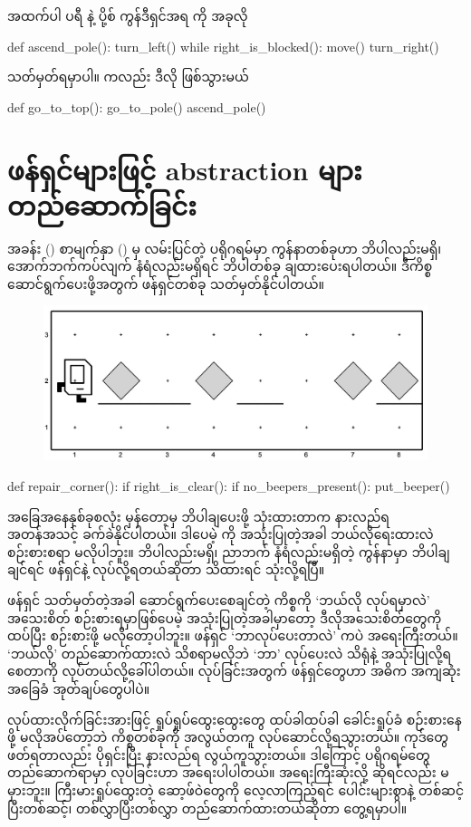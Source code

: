 အထက်ပါ ပရီ နဲ့ ပို့စ် ကွန်ဒီရှင်အရ  ကို အခုလို 
%
\begin{py}
def ascend_pole():
    turn_left()
    while right_is_blocked():
        move()
    turn_right()
\end{py}
%
သတ်မှတ်ရမှာပါ။  ကလည်း ဒီလို ဖြစ်သွားမယ်
%
\begin{py}
def go_to_top():
    go_to_pole()
    ascend_pole()
\end{py}
%

\section{ဖန်ရှင်များဖြင့် abstraction များ တည်ဆောက်ခြင်း}
အခန်း (\fRefNo{\ref{ch:ch02}}) စာမျက်နှာ (\fRefNo{\pageref{lst:repair_street}}) မှ လမ်းပြင်တဲ့ ပရိုဂရမ်မှာ ကွန်နာတစ်ခုဟာ ဘိပါလည်းမရှိ၊ အောက်ဘက်ကပ်လျက် နံရံလည်းမရှိရင်  ဘိပါတစ်ခု ချထားပေးရပါတယ်။ ဒီကိစ္စ ဆောင်ရွက်ပေးဖို့အတွက် ဖန်ရှင်တစ်ခု သတ်မှတ်နိုင်ပါတယ်။ 
%
\begin{figure}[htb!]
    {\includegraphics[width=0.5\linewidth]{images/ch02/st_repair/init.jpg}}
    \caption{}
\end{figure}
%
%
\begin{py}
def repair_corner():
    if right_is_clear():
        if no_beepers_present():
            put_beeper()
\end{py}
%
အခြေအနေနှစ်ခုစလုံး မှန်တော့မှ ဘိပါချပေးဖို့    သုံးထားတာက နားလည်ရ အတန်အသင့် ခက်ခဲနိုင်ပါတယ်။  ဒါပေမဲ့  ကို အသုံးပြုတဲ့အခါ ဘယ်လိုရေးထားလဲ စဉ်းစားစရာ မလိုပါဘူး။ ဘိပါလည်းမရှိ၊ ညာဘက် နံရံလည်းမရှိတဲ့ ကွန်နာမှာ ဘိပါချချင်ရင်  ဖန်ရှင်နဲ့ လုပ်လို့ရတယ်ဆိုတာ သိထားရင် သုံးလို့ရပြီ။

ဖန်ရှင် သတ်မှတ်တဲ့အခါ ဆောင်ရွက်ပေးစေချင်တဲ့ ကိစ္စကို ‘ဘယ်လို လုပ်ရမှာလဲ’ အသေးစိတ် စဉ်းစားရမှာဖြစ်ပေမဲ့ အသုံးပြုတဲ့အခါမှာတော့ ဒီလိုအသေးစိတ်တွေကို ထပ်ပြီး စဉ်းစားဖို့ မလိုတော့ပါဘူး။ ဖန်ရှင် ‘ဘာလုပ်ပေးတာလဲ’ ကပဲ အရေးကြီးတယ်။ ‘ဘယ်လို’ တည်ဆောက်ထားလဲ သိစရာမလိုဘဲ ‘ဘာ’ လုပ်ပေးလဲ သိရုံနဲ့ အသုံးပြုလို့ရစေတာကို  လုပ်တယ်လို့ခေါ်ပါတယ်။  လုပ်ခြင်းအတွက် ဖန်ရှင်တွေဟာ အဓိက အကျဆုံး အခြေခံ အုတ်ချပ်တွေပါပဲ။ 


 လုပ်ထားလိုက်ခြင်းအားဖြင့် ရှုပ်ရှုပ်ထွေးထွေးတွေ ထပ်ခါထပ်ခါ ခေါင်းရှုပ်ခံ စဉ်းစားနေဖို့ မလိုအပ်တော့ဘဲ ကိစ္စတစ်ခုကို အလွယ်တကူ လုပ်ဆောင်လို့ရသွားတယ်။ ကုဒ်တွေဖတ်ရတာလည်း ပိုရှင်းပြီး နားလည်ရ လွယ်ကူသွားတယ်။ ဒါကြောင့် ပရိုဂရမ်တွေ တည်ဆောက်ရာမှာ  လုပ်ခြင်းဟာ အရေးပါပါတယ်။ အရေးကြီးဆုံးလို့ ဆိုရင်လည်း မမှားဘူး။  ကြီးမားရှုပ်ထွေးတဲ့ ဆော့ဖ်ဝဲတွေကို လေ့လာကြည့်ရင်   ပေါင်းများစွာနဲ့ တစ်ဆင့်ပြီးတစ်ဆင့်၊ တစ်လွှာပြီးတစ်လွှာ တည်ဆောက်ထားတယ်ဆိုတာ တွေ့ရမှာပါ။

